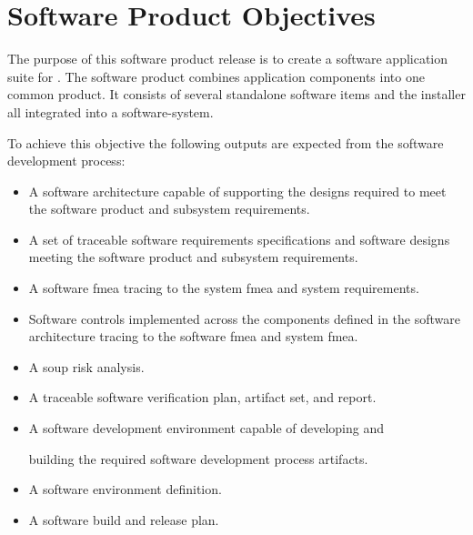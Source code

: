 \section{Software Product Objectives}
The purpose of this software product release is to create a software application
suite for \autodocCompanyName. The software product combines application
components into one common product. It consists of several standalone software
items and the \gls{installer} all integrated into a \gls{software-system}.

\tlcVspace

To achieve this objective the following outputs are expected from the software
development process:
\begin{itemize}
  \item A software architecture capable of supporting the designs required to
    meet the software product and subsystem requirements.

  \item A set of traceable software requirements specifications and software
    designs meeting the software product and subsystem requirements.

  \item A software \Gls{fmea} tracing to the system \Gls{fmea} and system
    requirements.

  \item Software controls implemented across the components defined in the
    software architecture tracing to the software \Gls{fmea} and system
    \Gls{fmea}.

  \item A \gls{soup} risk analysis.

  \item A traceable software verification plan, artifact set, and report.

  \item A software development environment capable of developing and

    building the required software development process artifacts.

  \item A software environment definition.

  \item A software \gls{build} and release plan.
\end{itemize}

